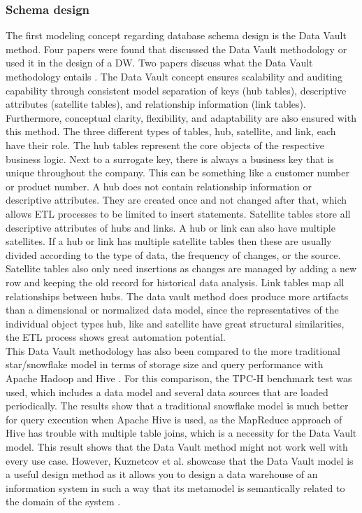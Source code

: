 \documentclass[11pt]{article}
\begin{document}
\subsubsection{Schema design}
The first modeling concept regarding database schema design is the Data Vault method. Four papers were found that discussed the Data Vault methodology or used it in the design of a DW. Two papers discuss what the Data Vault methodology entails \cite{Gluchowski2021277, Jaksic2020813}. The Data Vault concept ensures scalability and auditing capability through consistent model separation of keys (hub tables), descriptive attributes (satellite tables), and relationship information (link tables). Furthermore, conceptual clarity, flexibility, and adaptability are also ensured with this method. The three different types of tables, hub, satellite, and link, each have their role. The hub tables represent the core objects of the respective business logic. Next to a surrogate key, there is always a business key that is unique throughout the company. This can be something like a customer number or product number. A hub does not contain relationship information or descriptive attributes. They are created once and not changed after that, which allows ETL processes to be limited to insert statements. Satellite tables store all descriptive attributes of hubs and links. A hub or link can also have multiple satellites. If a hub or link has multiple satellite tables then these are usually divided according to the type of data, the frequency of changes, or the source. Satellite tables also only need insertions as changes are managed by adding a new row and keeping the old record for historical data analysis. Link tables map all relationships between hubs. The data vault method does produce more artifacts than a dimensional or normalized data model, since the representatives of the individual object types hub, like and satellite have great structural similarities, the ETL process shows great automation potential. \\

This Data Vault methodology has also been compared to the more traditional star/snowflake model in terms of storage size and query performance with Apache Hadoop and Hive \cite{Grigoriev2021147}. For this comparison, the TPC-H benchmark test was used, which includes a data model and several data sources that are loaded periodically. The results show that a traditional snowflake model is much better for query execution when Apache Hive is used, as the MapReduce approach of Hive has trouble with multiple table joins, which is a necessity for the Data Vault model. This result shows that the Data Vault method might not work well with every use case. However, Kuznetcov et al. showcase that the Data Vault model is a useful design method as it allows you to design a data warehouse of an information system in such a way that its metamodel is semantically related to the domain of the system \cite{Kuznetcov2019}. \\
\end{document}
